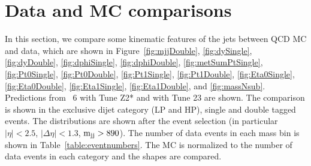 \newpage
\section{Data and MC comparisons}
\label{sec:data-mc-comp}

In this section, we compare some kinematic features of the jets between QCD MC and data, which are
 shown in Figure~\ref{fig:mjjDouble}, \ref{fig:dySingle}, \ref{fig:dyDouble}, \ref{fig:dphiSingle}, 
\ref{fig:dphiDouble}, \ref{fig:metSumPtSingle},
\ref{fig:Pt0Single}, \ref{fig:Pt0Double}, \ref{fig:Pt1Single}, \ref{fig:Pt1Double},
\ref{fig:Eta0Single}, \ref{fig:Eta0Double}, \ref{fig:Eta1Single}, \ref{fig:Eta1Double},
and \ref{fig:massNsub}.
Predictions from \PYTHIA~6 with Tune Z2* and \HERWIG{++} with Tune 23 are shown.
The comparison is shown in the exclusive dijet category (LP and HP),  single and double tagged events.
The distributions are shown after the event selection (in particular $|\eta| < 2.5$, $|\Delta\eta|<1.3$, ${\rm m_{jj} > 890} $\GeVcc).
The number of data events in each mass bin is shown in Table~\ref{table:eventnumbers}.
The MC is normalized to the number of data events in each category and the shapes are compared.


